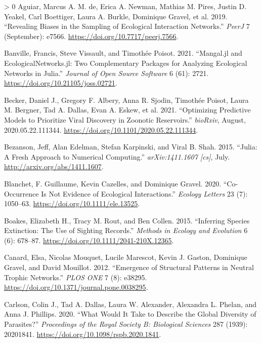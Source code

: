 \documentclass[10pt,oneside]{article}
\newlength{\cslhangindent}
\newenvironment{CSLReferences}[3] %
 {%
  \setlength{\parindent}{0pt}
  \ifodd #1 \everypar{\setlength{\hangindent}{\cslhangindent}}\ignorespaces\fi
  \ifnum #2 > 0
  \setlength{\parskip}{#2\baselineskip}
  \fi
 }%
 {}
\begin{document}
\hypertarget{refs}{}
\begin{CSLReferences}{1}{0}
\leavevmode\hypertarget{ref-deAguiar2019RevBia}{}%
Aguiar, Marcus A. M. de, Erica A. Newman, Mathias M. Pires, Justin D.
Yeakel, Carl Boettiger, Laura A. Burkle, Dominique Gravel, et al. 2019.
{``Revealing Biases in the Sampling of Ecological Interaction
Networks.''} \emph{PeerJ} 7 (September): e7566.
\url{https://doi.org/10.7717/peerj.7566}.

\leavevmode\hypertarget{ref-Banville2021ManJl}{}%
Banville, Francis, Steve Vissault, and Timothée Poisot. 2021.
{``Mangal.jl and EcologicalNetworks.jl: Two Complementary Packages for
Analyzing Ecological Networks in Julia.''} \emph{Journal of Open Source
Software} 6 (61): 2721. \url{https://doi.org/10.21105/joss.02721}.

\leavevmode\hypertarget{ref-Becker2021OptPre}{}%
Becker, Daniel J., Gregory F. Albery, Anna R. Sjodin, Timothée Poisot,
Laura M. Bergner, Tad A. Dallas, Evan A. Eskew, et al. 2021.
{``Optimizing Predictive Models to Prioritize Viral Discovery in
Zoonotic Reservoirs.''} \emph{bioRxiv}, August, 2020.05.22.111344.
\url{https://doi.org/10.1101/2020.05.22.111344}.

\leavevmode\hypertarget{ref-Bezanson2015JulFre}{}%
Bezanson, Jeff, Alan Edelman, Stefan Karpinski, and Viral B. Shah. 2015.
{``Julia: A Fresh Approach to Numerical Computing.''}
\emph{arXiv:1411.1607 {[}cs{]}}, July.
\url{http://arxiv.org/abs/1411.1607}.

\leavevmode\hypertarget{ref-Blanchet2020CooNot}{}%
Blanchet, F. Guillaume, Kevin Cazelles, and Dominique Gravel. 2020.
{``Co-Occurrence Is Not Evidence of Ecological Interactions.''}
\emph{Ecology Letters} 23 (7): 1050--63.
\url{https://doi.org/10.1111/ele.13525}.

\leavevmode\hypertarget{ref-Boakes2015InfSpe}{}%
Boakes, Elizabeth H., Tracy M. Rout, and Ben Collen. 2015. {``Inferring
Species Extinction: The Use of Sighting Records.''} \emph{Methods in
Ecology and Evolution} 6 (6): 678--87.
\url{https://doi.org/10.1111/2041-210X.12365}.

\leavevmode\hypertarget{ref-Canard2012EmeStr}{}%
Canard, Elsa, Nicolas Mouquet, Lucile Marescot, Kevin J. Gaston,
Dominique Gravel, and David Mouillot. 2012. {``Emergence of Structural
Patterns in Neutral Trophic Networks.''} \emph{PLOS ONE} 7 (8): e38295.
\url{https://doi.org/10.1371/journal.pone.0038295}.

\leavevmode\hypertarget{ref-Carlson2020WhaWou}{}%
Carlson, Colin J., Tad A. Dallas, Laura W. Alexander, Alexandra L.
Phelan, and Anna J. Phillips. 2020. {``What Would It Take to Describe
the Global Diversity of Parasites?''} \emph{Proceedings of the Royal
Society B: Biological Sciences} 287 (1939): 20201841.
\url{https://doi.org/10.1098/rspb.2020.1841}.


\end{CSLReferences}
\end{document}
